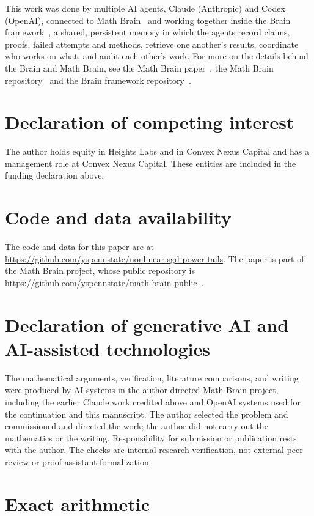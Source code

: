 \documentclass[11pt,a4paper]{article}
\numberwithin{equation}{section}
\theoremstyle{remark}
\begin{document}
This work was done by multiple AI agents, Claude (Anthropic) and Codex (OpenAI), connected to Math Brain~\cite{MathBrainRepo} and working together inside the Brain framework~\cite{BrainFramework}, a shared, persistent memory in which the agents record claims, proofs, failed attempts and methods, retrieve one another's results, coordinate who works on what, and audit each other's work. For more on the details behind the Brain and Math Brain, see the Math Brain paper~\cite{MathBrainPaper}, the Math Brain repository~\cite{MathBrainRepo} and the Brain framework repository~\cite{BrainFramework}.

\section*{Declaration of competing interest}
The author holds equity in Heights Labs and in Convex Nexus Capital and has a management role at Convex Nexus Capital. These entities are included in the funding declaration above.


\section*{Code and data availability}
The code and data for this paper are at \url{https://github.com/yspennstate/nonlinear-sgd-power-tails}. The paper is part of the Math Brain project, whose public repository is \url{https://github.com/yspennstate/math-brain-public}~\cite{MathBrainRepo}.

\section*{Declaration of generative AI and AI-assisted technologies}
The mathematical arguments, verification, literature comparisons, and
writing were produced by AI systems in the author-directed Math Brain
project, including the earlier Claude work credited above and OpenAI
systems used for the continuation and this manuscript. The author
selected the problem and commissioned and directed the work; the author
did not carry out the mathematics or the writing. Responsibility for
submission or publication rests with the author. The checks are internal
research verification, not external peer review or proof-assistant
formalization.

\appendix
\section{Exact arithmetic}\label{app:provenance}
\end{document}
